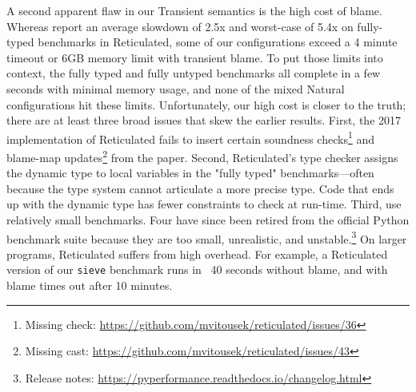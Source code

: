 A second apparent flaw in our Transient semantics is the high cost of blame.
Whereas \citet{vss-popl-2017} report an average slowdown of 2.5x and
worst-case of 5.4x on fully-typed benchmarks in Reticulated,
some of our configurations exceed a 4 minute timeout or 6GB memory limit with transient blame.
To put those limits into context, the fully typed and fully untyped benchmarks all complete in a few seconds with minimal memory usage, and none of the mixed Natural configurations hit these limits.
Unfortunately, our high cost is closer to the truth;
 there are at least three broad issues that skew the earlier results.
First, the 2017 implementation of Reticulated fails to insert certain
 soundness checks\footnote{Missing check: \url{https://github.com/mvitousek/reticulated/issues/36}}
 and blame-map updates\footnote{Missing cast: \url{https://github.com/mvitousek/reticulated/issues/43}}
 from the paper.
Second, Reticulated's type checker assigns the dynamic type to local
 variables in the "fully typed" benchmarks---often because the type system
 cannot articulate a more precise type.
Code that ends up with the dynamic type has fewer constraints to check at run-time.
Third, \citet{vss-popl-2017} use relatively small benchmarks.
Four have since been retired from the official Python benchmark suite
 because they are too small, unrealistic, and unstable.\footnote{Release notes: \url{https://pyperformance.readthedocs.io/changelog.html}}
On larger programs, Reticulated suffers from high overhead.
For example, a Reticulated version of our \texttt{sieve} benchmark runs in
 ~40 seconds without blame, and with blame times out after 10 minutes.




